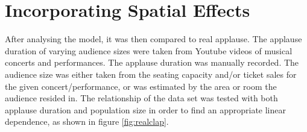 \chapter{Incorporating Spatial Effects}
\label{chap4}

\hspace{\parindent} After analysing the model, it was then compared to real applause.
The applause duration of varying audience sizes were taken from Youtube videos of musical concerts and performances.
The applause duration was manually recorded.
The audience size was either taken from the seating capacity and/or ticket sales for the given concert/performance, or was estimated by the area or room the audience resided in.
The relationship of the data set was tested with both applause duration and population size in order to find an appropriate linear dependence, as shown in figure \ref{fig:realclap}.

